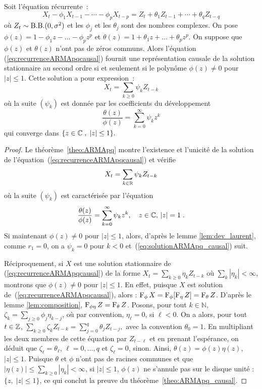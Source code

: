 \begin{theorem}
\label{theo:ARMApq_causal}
Soit l'\'equation r\'ecurrente~:
\begin{equation}
 \label{eq:recurrenceARMApqcausal}
  X_t - \phi_1 X_{t-1} - \cdots - \phi_p X_{t-p}
  =
  Z_t + \theta_1 Z_{t-1} + \cdots + \theta_q Z_{t-q}
\end{equation} o\`u $Z_t \sim \mathrm{B.B.}(0,\sigma^2)$ et les
$\phi_j$ et les $\theta_j$ sont des nombres complexes. On pose
$\phi(z)= 1 - \phi_1 z - \dots - \phi_p z^p$ et $\theta(z)= 1 +
\theta_1 z + \dots + \theta_p z^p$. On suppose que $\phi(z)$ et
$\theta(z)$ n'ont pas de z\'eros communs. Alors l'\'equation
(\ref{eq:recurrenceARMApqcausal})
fournit une repr\'esentation causale de la solution stationnaire au second ordre
si et seulement si le polyn\^ome $\phi(z)
\neq 0$ pour $|z| \leq 1$. Cette solution a pour
expression~:
\begin{equation}
 \label{eq:solutionARMApq_causal}
  X_t = \sum_{k\geq 0} \psi_k Z_{t-k}
\end{equation}
o\`u la suite $(\psi_k)$ est donn\'ee par les coefficients du d\'eveloppement
$$
\frac{\theta(z)}{\phi(z)}=\sum_{k=0}^{\infty} \psi_k z^k
$$
qui converge dans $\{z\in\mathbb{C}\;,\;|z|\leq 1\}.$
\end{theorem}
\begin{proof}\smartqed
Le th\'eor\`eme~\ref{theo:ARMApq} montre l'existence et l'unicit\'e
de la solution de l'\'equation~(\ref{eq:recurrenceARMApqcausal}) et v\'erifie
\begin{equation*}
  X_t = \sum_{k\in\mathbb{R}} \psi_k Z_{t-k}
\end{equation*}
o\`u la suite $(\psi_k)$ est caract\'eris\'ee par l'\'equation
$$
\frac{\theta(z)}{\phi(z)}=\sum_{k=0}^{\infty} \psi_k z^k,\quad z\in\mathbb{C},\,|z|=1\;.
$$
Si maintenant $\phi(z)\neq 0$ pour $|z|\leq 1$, alors, d'apr\`es le
 lemme \ref{lem:dev_laurent}, comme $r_1=0$, on a $\psi_k=0$ pour $k<0$
 et~(\ref{eq:solutionARMApq_causal}) suit.


R\'eciproquement, si $X$ est une solution stationnaire de
(\ref{eq:recurrenceARMApqcausal}) de la forme $X_t=\sum_{k\geq 0}\eta_k
Z_{t-k}$ o\`u $\sum_k |\eta_k|<\infty$, montrons que $\phi(z)\neq 0$ pour
$|z|\leq 1$. En effet, puisque $X$ est solution
de~(\ref{eq:recurrenceARMApqcausal}), alors : $\operatorname{F}_{\phi}
X=\operatorname{F}_{\phi}[\operatorname{F}_{\eta} Z]=\operatorname{F}_{\theta} Z$. D'apr\`es le lemme
\ref{lem:composition}, $\operatorname{F}_{\phi\eta}Z=\operatorname{F}_{\theta} Z$. Posons, pour
tout $k\in\mathbb{N}$, $\zeta_k=\sum_{j\geq 0}\phi_j \eta_{k-j}$, o\`u par
convention, $\eta_\ell=0$, si $\ell<0$.  On a alors, pour tout $t\in\mathbb{Z}$,
$\sum_{k\geq 0}\zeta_k Z_{t-k}=\sum_{j=0}^q\theta_j Z_{t-j},$ avec la
convention $\theta_0=1$.  En multipliant les deux membres de cette \'equation par
$Z_{t-\ell}$ et en prenant l'esp\'erance, on d\'eduit que $\zeta_\ell=\theta_\ell$,
$\ell=0,\dots,q$ et $\zeta_\ell=0$, sinon. Ainsi, $\theta(z)=\phi(z)\eta(z)$,
$|z|\leq 1$. Puisque $\theta$ et $\phi$ n'ont pas de racines communes et que
$|\eta(z)|\leq\sum_{k\geq 0}|\eta_k|<\infty$, si $|z|\leq 1$, $\phi(z)$ ne
s'annule pas sur le disque unit\'e : $\{z,\; |z|\leq 1\}$, ce qui conclut la
preuve du th\'eor\`eme~\ref{theo:ARMApq_causal}.

\end{proof}
